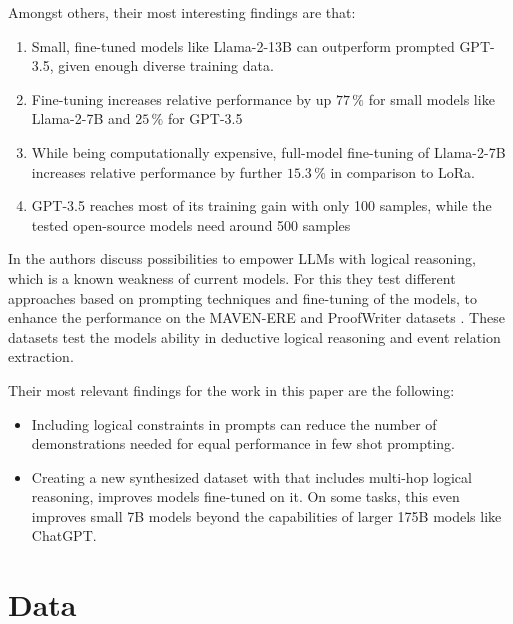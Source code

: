 \documentclass[11pt]{article}
\begin{document}
    Amongst others, their most interesting findings are that:
    \begin{enumerate}
      \item Small, fine-tuned models like Llama-2-13B can outperform prompted GPT-3.5, given enough diverse training data.
      \item Fine-tuning increases relative performance by up $77\,\%$ for small models like Llama-2-7B and $25\,\%$ for GPT-3.5
      \item While being computationally expensive, full-model fine-tuning of Llama-2-7B increases relative performance by further $15.3\,\%$ in comparison to LoRa.
      \item GPT-3.5 reaches most of its training gain with only 100 samples, while the tested open-source models need around 500 samples
    \end{enumerate}

    In\cite{chen_learning_2023} the authors discuss possibilities to empower LLMs with logical reasoning, which is a known
    weakness of current models.
    For this they test different approaches based on prompting techniques and fine-tuning of the models, to enhance the
    performance on the MAVEN-ERE and ProofWriter datasets \cite{tafjord_proofwriter_2021, wang_maven-ere_2022}.
    These datasets test the models ability in deductive logical reasoning and event relation extraction.

    Their most relevant findings for the work in this paper are the following:
    \begin{itemize}
        \item Including logical constraints in prompts can reduce the number of demonstrations needed for equal performance
        in few shot prompting.
        \item Creating a new synthesized dataset with that includes multi-hop logical reasoning, improves models fine-tuned
        on it.
        On some tasks, this even improves small 7B models beyond the capabilities of larger 175B models like ChatGPT.
    \end{itemize}


    \section{Data}\label{sec:data}
\end{document}
